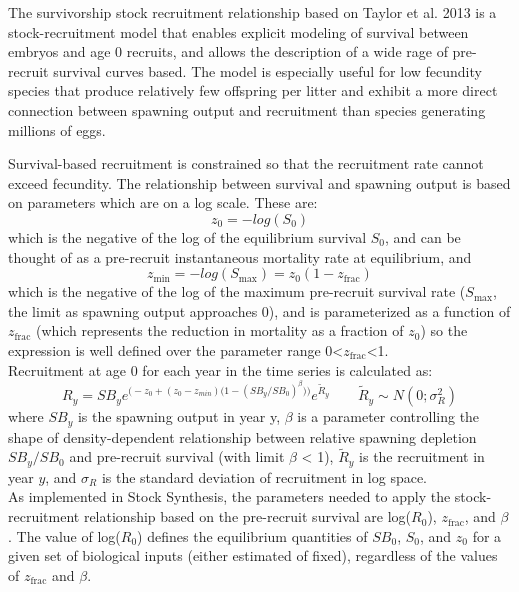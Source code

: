 \hypertarget{Survivorship}{}
The survivorship stock recruitment relationship based on Taylor et al. 2013 is a stock-recruitment model that enables explicit modeling of survival between embryos and age 0 recruits, and allows the description of a wide rage of pre-recruit survival curves based.  The model is especially useful for low fecundity species that produce relatively few offspring per litter and exhibit a more direct connection between spawning output and recruitment than species generating millions of eggs.
	
Survival-based recruitment is constrained so that the recruitment rate cannot exceed fecundity. The relationship between survival and spawning output is based on parameters which are on a log scale. These are:
	\begin{equation}
		z_0=-log(S_0)
	\end{equation} 
which is the negative of the log of the equilibrium survival $S_0$, and can be thought of as a pre-recruit instantaneous mortality rate at equilibrium, and
	\begin{equation}
		z_{\text{min}}=-log(S_{\text{max}})=z_0(1-z_{\text{frac}})
	\end{equation}
which is the negative of the log of the maximum pre-recruit survival rate ($S_{\text{max}}$, the limit as spawning output approaches 0), and is parameterized as a function of $z_{\text{frac}}$ (which represents the reduction in mortality as a fraction of $z_0$) so the expression is well defined over the parameter range 0<$z_{\text{frac}}$<1.\\
	
Recruitment at age 0 for each year in the time series is calculated as:
	\begin{equation}{ R_y = SB_ye^{\Big(-z_0 + (z_0-z_{min})\big(1-(SB_y/SB_0)^\beta \big)\Big)}e^{\tilde{R}_y}\qquad  \tilde{R}_y\sim N(0;\sigma^2_R)}
	\end{equation}
where $SB_y$ is the spawning output in year y,  $\beta$ is a parameter controlling the shape of density-dependent relationship between relative spawning depletion $SB_y/SB_0$ and pre-recruit survival (with limit $\beta$ < 1), $\tilde{R}_y$ is the recruitment in year $y$, and $\sigma_R$ is the standard deviation of recruitment in log space. \\
	
As implemented in Stock Synthesis, the parameters needed to apply the stock-recruitment relationship based on the pre-recruit survival are log($R_0$), $z_{\text{frac}}$, and $\beta$. The value of log($R_0$) defines the equilibrium quantities of $SB_0$, $S_0$, and $z_0$ for a given set of biological inputs (either estimated of fixed), regardless of the values of $z_{\text{frac}}$ and $\beta$.\\
	
